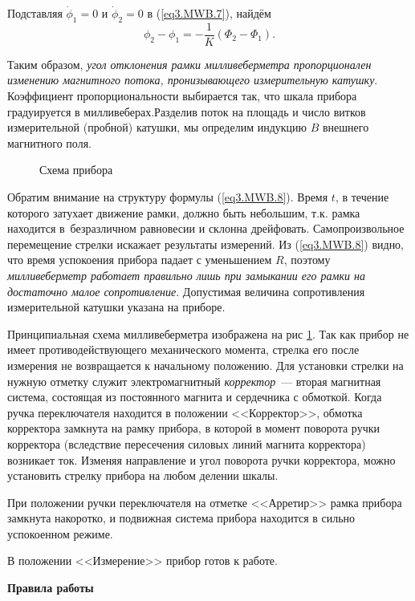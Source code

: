 Подставляя $\dot{\phi}_1=0$ и $\dot{\phi}_2=0$ в (\ref{eq3.MWB.7}), найдём
\begin{equation}
\phi_2-\phi_1=-\frac{1}{K}(\Phi_2-\Phi_1).
\label{eq3.MWB.9}
\end{equation}

Таким образом, \emph{угол отклонения рамки милливеберметра пропорционален изменению магнитного потока, пронизывающего измерительную катушку}. Коэффициент пропорциональности выбирается так, что шкала прибора градуируется в милливеберах.Разделив поток на площадь и число витков измерительной (пробной) катушки, мы определим индукцию $B$ внешнего магнитного поля.

\begin{figure}
\caption{Схема прибора}
\label{fig3.MWB.2}
\end{figure}

Обратим внимание на структуру формулы (\ref{eq3.MWB.8}). Время $t$, в течение которого затухает движение рамки, должно быть небольшим, т.к. рамка находится в~безразличном равновесии и склонна дрейфовать. Самопроизвольное перемещение стрелки искажает результаты измерений. Из (\ref{eq3.MWB.8}) видно, что время успокоения прибора падает с уменьшением $R$, поэтому
\emph{милливеберметр работает правильно лишь при замыкании его рамки на достаточно малое сопротивление}. Допустимая величина сопротивления измерительной катушки указана на приборе.

Принципиальная схема милливеберметра изображена на рис \ref{fig3.MWB.2}. Так как прибор не имеет противодействующего механического момента, стрелка его после измерения не возвращается к начальному положению. Для установки стрелки на нужную отметку служит электромагнитный \emph {корректор}~--- вторая магнитная система, состоящая из постоянного магнита и сердечника с обмоткой. Когда ручка переключателя находится в положении <<Корректор>>, обмотка корректора замкнута на рамку прибора, в которой в момент поворота ручки корректора (вследствие пересечения силовых линий магнита корректора) возникает ток.
Изменяя направление и угол поворота ручки корректора, можно установить стрелку прибора на любом делении шкалы.

При положении ручки переключателя на отметке <<Арретир>> рамка прибора замкнута накоротко, и подвижная система прибора находится в сильно успокоенном режиме.

В положении <<Измерение>> прибор готов к работе.


{\large \bf Правила работы}

